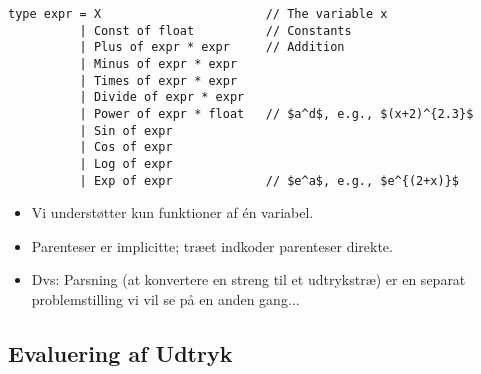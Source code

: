 \documentclass[rgb]{beamer}
\begin{document}
\begin{frame}[fragile]
\begin{footnotesize}

  \vspace{1ex}

\begin{lstlisting}[numbers=none,frame=none,mathescape]
type expr = X                       // The variable x
          | Const of float          // Constants
          | Plus of expr * expr     // Addition
          | Minus of expr * expr
          | Times of expr * expr
          | Divide of expr * expr
          | Power of expr * float   // $a^d$, e.g., $(x+2)^{2.3}$
          | Sin of expr
          | Cos of expr
          | Log of expr
          | Exp of expr             // $e^a$, e.g., $e^{(2+x)}$
\end{lstlisting}

\begin{itemize}
\item Vi understøtter kun funktioner af \'{e}n variabel.
\item Parenteser er implicitte; træet indkoder parenteser direkte.
\item Dvs: Parsning (at konvertere en streng til et udtrykstræ) er en
  separat problemstilling vi vil se på en anden gang...
\end{itemize}

\end{footnotesize}
\end{frame}

\subsection{Evaluering af Udtryk}
\end{document}
